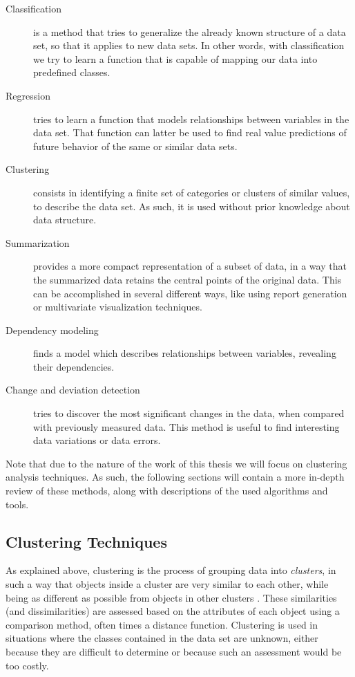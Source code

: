 \begin{description}

  \item[Classification]
  is a method that tries to generalize the already known structure of a
  data set, so that it applies to new data sets. In other words, with
  classification we try to learn a function that is capable of mapping our data
  into predefined classes.

  \item[Regression]
  tries to learn a function that models relationships between variables in the
  data set. That function can latter be used to find real value predictions of
  future behavior of the same or similar data sets.

  \item[Clustering]
  consists in identifying a finite set of categories or clusters of similar
  values, to describe the data set. As such, it is used without prior knowledge
  about data structure.

  \item[Summarization]
  provides a more compact representation of a subset of data, in a way that the
  summarized data retains the central points of the original data. This can be
  accomplished in several different ways, like using report generation or
  multivariate visualization techniques.

  \item[Dependency modeling]
  finds a model which describes relationships between variables, revealing their
  dependencies.

  \item[Change and deviation detection]
  tries to discover the most significant changes in the data, when compared with
  previously measured data. This method is useful to find interesting data
  variations or data errors.

\end{description}

Note that due to the nature of the work of this thesis we will focus on
clustering analysis techniques. As such, the following sections will contain a
more in-depth review of these methods, along with descriptions of the used
algorithms and tools.

\subsection{Clustering Techniques}\label{sec:clustertech}

As explained above, clustering is the process of grouping data into
\emph{clusters}, in such a way that objects inside a cluster are very similar to
each other, while being as different as possible from objects in other clusters
\cite{han2006data}. These similarities (and dissimilarities) are assessed based
on the attributes of each object using a comparison method, often times a
distance function. Clustering is used in situations where the classes contained
in the data set are unknown, either because they are difficult to determine or
because such an assessment would be too costly.

